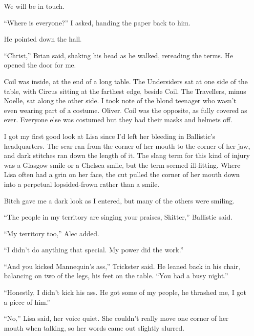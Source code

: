 We will be in touch.



``Where is everyone?'' I asked, handing the paper back to him.



He pointed down the hall.



``Christ,'' Brian said, shaking his head as he walked, rereading the terms.  He opened the door for me.



Coil was inside, at the end of a long table.  The Undersiders sat at one side of the table, with Circus sitting at the farthest edge, beside Coil.  The Travellers, minus Noelle, sat along the other side.  I took note of the blond teenager who wasn't even wearing part of a costume.  Oliver.  Coil was the opposite, as fully covered as ever.  Everyone else was costumed but they had their masks and helmets off.



I got my first good look at Lisa since I'd left her bleeding in Ballistic's headquarters.  The scar ran from the corner of her mouth to the corner of her jaw, and dark stitches ran down the length of it.  The slang term for this kind of injury was a Glasgow smile or a Chelsea smile, but the term seemed ill-fitting.  Where Lisa often had a grin on her face, the cut pulled the corner of her mouth down into a perpetual lopsided-frown rather than a smile.



Bitch gave me a dark look as I entered, but many of the others were smiling.



``The people in my territory are singing your praises, Skitter,'' Ballistic said.



``My territory too,'' Alec added.



``I didn't do anything that special.  My power did the work.''



``And you kicked Mannequin's ass,'' Trickster said.  He leaned back in his chair, balancing on two of the legs, his feet on the table.  ``You had a busy night.''



``Honestly, I didn't kick his ass.  He got some of my people, he thrashed me, I got a piece of him.''



``No,'' Lisa said, her voice quiet.  She couldn't really move one corner of her mouth when talking, so her words came out slightly slurred.



